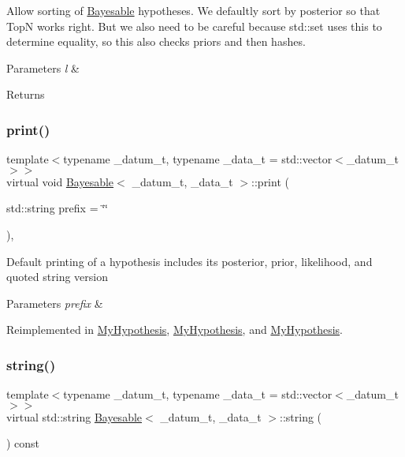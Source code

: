 Allow sorting of \hyperlink{class_bayesable}{Bayesable} hypotheses. We defaultly sort by posterior so that TopN works right. But we also need to be careful because std\+::set uses this to determine equality, so this also checks priors and then hashes. 
\begin{DoxyParams}{Parameters}
{\em l} & \\
\hline
\end{DoxyParams}
\begin{DoxyReturn}{Returns}

\end{DoxyReturn}
\mbox{\label{class_bayesable_a87d5d9481d6a72b017e44b175071fa5e}} 
\subsubsection{\texorpdfstring{print()}{print()}}
{\footnotesize\ttfamily template$<$typename \+\_\+datum\+\_\+t, typename \+\_\+data\+\_\+t = std\+::vector$<$\+\_\+datum\+\_\+t$>$$>$ \\
virtual void \hyperlink{class_bayesable}{Bayesable}$<$ \+\_\+datum\+\_\+t, \+\_\+data\+\_\+t $>$\+::print (\begin{DoxyParamCaption}\item[{std\+::string}]{prefix = {\ttfamily \char`\"{}\char`\"{}} }\end{DoxyParamCaption})\hspace{0.3cm}{\ttfamily [inline]}, {\ttfamily [virtual]}}

Default printing of a hypothesis includes its posterior, prior, likelihood, and quoted string version 
\begin{DoxyParams}{Parameters}
{\em prefix} & \\
\hline
\end{DoxyParams}


Reimplemented in \hyperlink{class_my_hypothesis_a91fd22a2724e04c0e7c67ea4282beac4}{My\+Hypothesis}, \hyperlink{class_my_hypothesis_a81fa991ffd2cabe6f71ec129ae26ca6c}{My\+Hypothesis}, and \hyperlink{class_my_hypothesis_a91fd22a2724e04c0e7c67ea4282beac4}{My\+Hypothesis}.

\mbox{\label{class_bayesable_afcea9b439bcf321d5354710d8861cb54}} 
\subsubsection{\texorpdfstring{string()}{string()}}
{\footnotesize\ttfamily template$<$typename \+\_\+datum\+\_\+t, typename \+\_\+data\+\_\+t = std\+::vector$<$\+\_\+datum\+\_\+t$>$$>$ \\
virtual std\+::string \hyperlink{class_bayesable}{Bayesable}$<$ \+\_\+datum\+\_\+t, \+\_\+data\+\_\+t $>$\+::string (\begin{DoxyParamCaption}{ }\end{DoxyParamCaption}) const\hspace{0.3cm}{\ttfamily [pure virtual]}}



